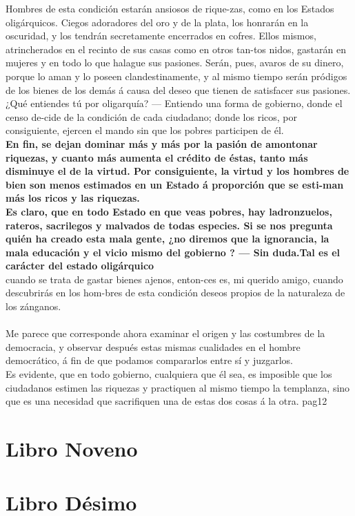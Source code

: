 \documentclass[10pt]{book}
\begin{document}
Hombres de esta condición  estarán  ansiosos de rique-zas,  como en los Estados  oligárquicos.  Ciegos  adoradores  del  oro y  de la plata,  los honrarán  en  la  oscuridad,  y  los  tendrán  secretamente  encerrados  en  cofres.  Ellos mismos, atrincherados  en  el recinto  de sus casas como en otros  tan-tos nidos, gastarán  en  mujeres  y  en  todo lo  que  halague  sus pasiones. Serán,  pues, avaros  de  su  dinero,  porque  lo  aman  y  lo  poseen  clandestinamente,  y   al   mismo   tiempo  serán  pródigos  de  los bienes  de los demás á  causa  del  deseo  que  tienen  de satisfacer  sus  pasiones.\\
¿Qué entiendes  tú por  oligarquía?  — Entiendo  una  forma  de gobierno,  donde  el censo de-cide  de la  condición  de  cada  ciudadano;  donde  los  ricos,  por  consiguiente, ejercen  el mando sin que los pobres  participen  de  él.  \\
\textbf{ En  fin,  se dejan  dominar  más  y más por la  pasión  de  amontonar riquezas,  y  cuanto  más  aumenta  el  crédito  de  éstas,  tanto  más  disminuye  el  de  la  virtud. Por  consiguiente, la virtud  y  los hombres de  bien son menos estimados  en  un  Estado  á  proporción  que  se esti-man  más  los ricos  y  las riquezas.}\\
\textbf{Es claro,   que  en   todo  Estado  en  que  veas pobres, hay ladronzuelos,  rateros, sacrilegos y  malvados de todas especies.  Si se  nos pregunta  quién  ha  creado  esta  mala  gente,  ¿no diremos  que  la  ignorancia,  la  mala  educación  y  el vicio mismo del gobierno ? — Sin  duda.Tal es el carácter del estado oligárquico}\\
cuando se trata  de gastar  bienes  ajenos,  enton-ces  es, mi querido amigo,  cuando descubrirás en los hom-bres de esta  condición  deseos  propios de la naturaleza  de  los  zánganos. \\\\
Me parece  que  corresponde ahora  examinar el origen y  las costumbres  de  la   democracia,  y  observar  después  estas  mismas cualidades  en  el  hombre  democrático,  á fin de que  podamos compararlos  entre  sí y juzgarlos.\\
Es  evidente,  que  en  todo gobierno, cualquiera que  él  sea,  es  imposible  que  los ciudadanos  estimen  las  riquezas  y  practiquen  al  mismo  tiempo  la  templanza,  sino  que  es  una  necesidad  que  sacrifiquen  una  de estas  dos  cosas á la otra.
pag12









\chapter*{Libro Noveno}

\chapter*{Libro Désimo}
 
\end{document}
